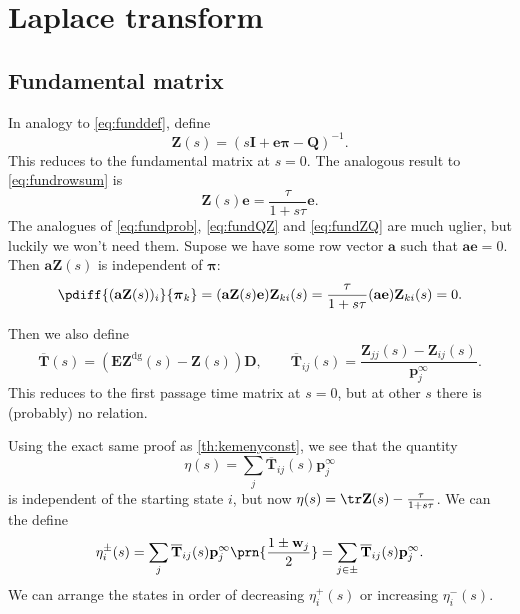 \documentclass[12pt]{article}
\newcommand{\inv}{^{-1}}
\newcommand{\dg}{^\mathrm{dg}}
\newcommand{\I}{\mathbf{I}}
\newcommand{\onev}{\mathbf{e}}
\newcommand{\onem}{\mathbf{E}}
\newcommand{\MM}{\mathbf{Q}}
\newcommand{\eq}{\mathbf{p}^\infty}
\newcommand{\fpt}{\mathbf{T}}
\newcommand{\fptb}{\overline{\fpt}}
\newcommand{\fund}{\mathbf{Z}}
\newcommand{\D}{\mathbf{D}}
\newcommand{\pib}{\boldsymbol{\pi}}
\newcommand{\w}{\mathbf{w}}
\begin{document}
\section{Laplace transform}\label{sec:laplace}

\subsection{Fundamental matrix \etc}\label{sec:lfund}

In analogy to \eqref{eq:funddef}, define
%
\begin{equation}\label{eq:lfund}
  \fund(s) = (s\I +\onev\pib -\MM)\inv.
\end{equation}
%
This reduces to the fundamental matrix at $s=0$.
The analogous result to \eqref{eq:fundrowsum} is
%
\begin{equation}\label{eq:lfundrowsum}
  \fund(s)\onev = \frac{\tau}{1+s\tau}\onev.
\end{equation}
%
The analogues of \eqref{eq:fundprob}, \eqref{eq:fundQZ} and \eqref{eq:fundZQ} are much uglier, but luckily we won't need them.
Supose we have some row vector $\mathbf{a}$ such that $\mathbf{a}\onev=0$.
Then $\mathbf{a}\fund(s)$ is independent of $\pib$:
%
\begin{equation}\label{eq:alfund}
  \pdiff{(\mathbf{a}\fund(s))_i}{\pib_k} = (\mathbf{a}\fund(s)\onev) \fund_{ki}(s) = \frac{\tau}{1+s\tau} (\mathbf{a}\onev) \fund_{ki}(s) = 0.
\end{equation}
%


Then we also define
%
\begin{equation}\label{eq:lfptb}
  \fptb(s) = (\onem\fund\dg(s)-\fund(s))\D,
  \qquad
  \fptb_{ij}(s) = \frac{\fund_{jj}(s)-\fund_{ij}(s)}{\eq_j}.
\end{equation}
%
This reduces to the first passage time matrix at $s=0$, but at other $s$ there is (probably) no relation.

Using the exact same proof as \autoref{th:kemenyconst}, we see that the quantity
%
\begin{equation}\label{eq:lkemeny}
  \eta(s) = \sum_j \fptb_{ij}(s)\eq_j
\end{equation}
%
is independent of the starting state $i$, but now $\eta(s) = \tr\fund(s) - \frac{\tau}{1+s\tau}$.
We can the define
%
\begin{equation}\label{eq:lpmixtime}
  \eta^{\pm}_i(s) = \sum_j \fptb_{ij}(s)\eq_j \prn{\frac{1\pm\w_j}{2}} =  \sum_{j\in\pm} \fptb_{ij}(s)\eq_j.
\end{equation}
%
We can arrange the states in order of decreasing $\eta^{+}_i(s)$ or increasing $\eta^{-}_i(s)$.
\end{document}
